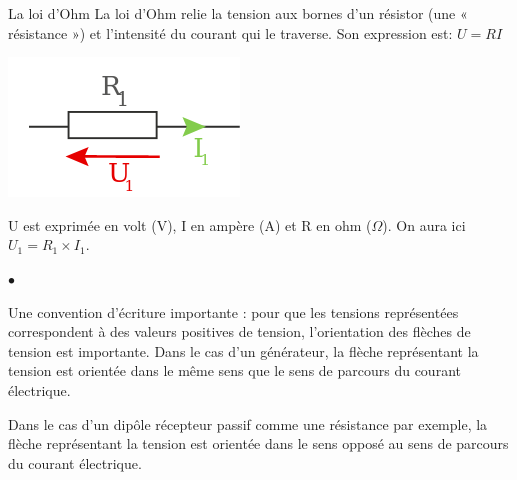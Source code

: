 \documentclass[24pt]{article}
\begin{document}
\begin{concept}{La loi d'Ohm}
    La loi d’Ohm relie la tension aux bornes d’un résistor (une « résistance ») et
    l’intensité du courant qui le traverse.
    Son expression est: $U = RI$

    \begin{center}
        \includegraphics[width=0.2\columnwidth]{ohm.png}
    \end{center}

    U est exprimée en volt (V), I en ampère (A) et R en ohm ($Ω$). On aura ici $U_1 = R_1 \times I_1$.

    \begin{list}{$\bullet$}{}
        \item Une convention d’écriture importante : pour que les tensions représentées
              correspondent à des valeurs positives de tension, l’orientation des flèches de
              tension est importante. Dans le cas d’un générateur, la flèche représentant la tension
              est orientée dans le même sens que le sens de parcours du courant électrique.

        \item Dans le cas d’un dipôle récepteur passif comme une résistance par exemple, la flèche
              représentant la tension est orientée dans le sens opposé au sens de parcours du courant électrique.
    \end{list}
\end{concept}
\end{document}
